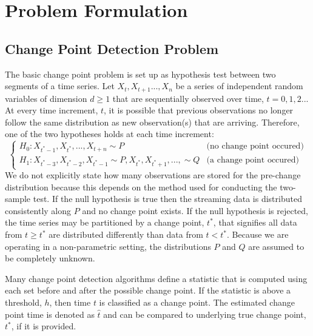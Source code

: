 \section{Problem Formulation}

\subsection{Change Point Detection Problem}
The basic change point problem is set up as hypothesis test between two segments of a time series. Let $X_t, X_{t+1}...,X_n$ be a series of independent random variables of dimension $d \geq 1$ that are sequentially observed over time, $t=0,1,2...$  At every time increment, $t$, it is possible that previous observations no longer follow the same distribution as new observation(s) that are arriving. Therefore, one of the two hypotheses holds at each time increment:
\begin{equation}
  \begin{cases}
    H_0: X_{t^*-1}, X_{t^*}, ...,X_{t+n} \sim  P & \text{(no change point occured)} \\
    H_1: X_{t^*-3},X_{t^*-2}, X_{t^*-1} \sim P, X_{t^*}, X_{t^*+1},...,  \sim Q & \text{(a change point occured)}
  \end{cases}
\end{equation}
We do not explicitly state how many observations are stored for the pre-change distribution because this depends on the method used for conducting the two-sample test. If the null hypothesis is true then the streaming data is distributed consistently along $P$ and no change point exists. If the null hypothesis is rejected, the time series may be partitioned by a change point, $t^*$, that signifies all data from $t \geq t^*$ are distributed differently than data from $t<t^*$. Because we are operating in a non-parametric setting, the distributions $P$ and $Q$ are assumed to be completely unknown. 



Many change point detection algorithms define a statistic that is computed using each set before and after the possible change point. If the statistic is above a threshold, $h$, then time $t$ is classified as a change point. The estimated change point time is denoted as $\hat{t}$ and can be compared to underlying true change point, $t^*$, if it is provided.

